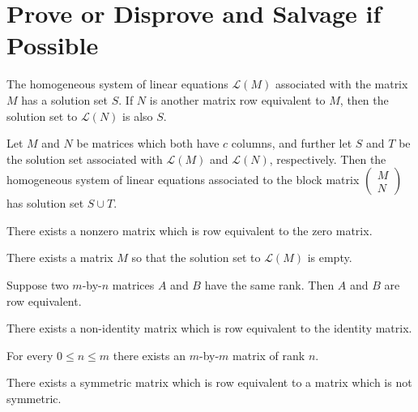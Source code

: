 \documentclass{homework}
\begin{document}
\section{Prove or Disprove and Salvage if Possible}

\begin{problem}
  The homogeneous system of linear equations $\mathcal{L}(M)$
  associated with the matrix $M$ has a solution set $S$.  If $N$ is
  another matrix row equivalent to $M$, then the solution set to
  $\mathcal{L}(N)$ is also $S$.
\end{problem}

\begin{problem}
  Let $M$ and $N$ be matrices which both have $c$ columns, and further
  let $S$ and $T$ be the solution set associated with $\mathcal{L}(M)$
  and $\mathcal{L}(N)$, respectively.  Then the homogeneous system of
  linear equations associated to the block matrix $\begin{pmatrix} M \\
    N \end{pmatrix}$ has solution set $S \cup T$.
\end{problem}

\begin{problem}
  There exists a nonzero matrix which is row equivalent to the zero matrix.
\end{problem}

\begin{problem}
  There exists a matrix $M$ so that the solution set to $\mathcal{L}(M)$ is empty.
\end{problem}

\begin{problem}
  Suppose two $m$-by-$n$ matrices $A$ and $B$ have the same rank.
  Then $A$ and $B$ are row equivalent.
\end{problem}

\begin{problem}
  There exists a non-identity matrix which is row equivalent to the identity
  matrix.
\end{problem}

\begin{problem}
  For every $0 \leq n \leq m$ there exists an $m$-by-$m$ matrix of rank $n$.
\end{problem}

\begin{problem}
  There exists a symmetric matrix which is row equivalent to a matrix which
  is not symmetric.
\end{problem}
\end{document}
